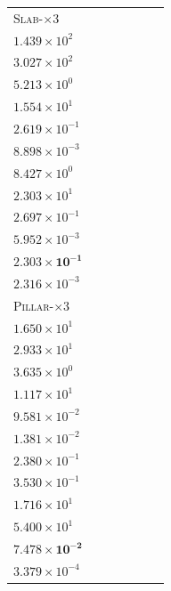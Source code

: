 \begin{table}[p]
{\begin{tabular}{lcccccc}
\textsc{Slab-$\times 3$} & \shortstack{$2.980\!\times\!10^{-1}$\\$1.439\!\times\!10^{2}$\\$3.027\!\times\!10^{2}$} & \shortstack{$2.980\!\times\!10^{-1}$\\$5.213\!\times\!10^{0}$\\$1.554\!\times\!10^{1}$} & \shortstack{$2.618\!\times\!10^{-1}$\\$2.619\!\times\!10^{-1}$\\$8.898\!\times\!10^{-3}$} & \shortstack{$1.057\!\times\!10^{0}$\\$8.427\!\times\!10^{0}$\\$2.303\!\times\!10^{1}$} & \shortstack{$2.688\!\times\!10^{-1}$\\$2.697\!\times\!10^{-1}$\\$5.952\!\times\!10^{-3}$} & \shortstack{$\mathbf{2.297\!\times\!10^{-1}}$\\$\mathbf{2.303\!\times\!10^{-1}}$\\$2.316\!\times\!10^{-3}$} \\
\rowcolor{black!6}
\textsc{Pillar-$\times 3$} & \shortstack{$1.024\!\times\!10^{-1}$\\$1.650\!\times\!10^{1}$\\$2.933\!\times\!10^{1}$} & \shortstack{$1.027\!\times\!10^{-1}$\\$3.635\!\times\!10^{0}$\\$1.117\!\times\!10^{1}$} & \shortstack{$9.213\!\times\!10^{-2}$\\$9.581\!\times\!10^{-2}$\\$1.381\!\times\!10^{-2}$} & \shortstack{$1.217\!\times\!10^{-1}$\\$2.380\!\times\!10^{-1}$\\$3.530\!\times\!10^{-1}$} & \shortstack{$8.291\!\times\!10^{-2}$\\$1.716\!\times\!10^{1}$\\$5.400\!\times\!10^{1}$} & \shortstack{$\mathbf{7.488\!\times\!10^{-2}}$\\$\mathbf{7.478\!\times\!10^{-2}}$\\$3.379\!\times\!10^{-4}$} \\

\end{tabular}}
\end{table}
